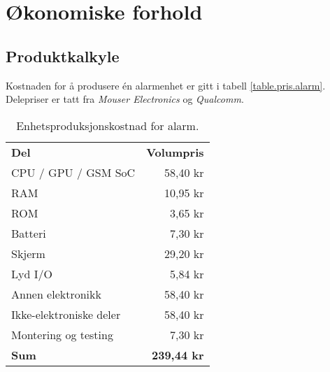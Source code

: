 



\clearpage
\section{Økonomiske forhold}

\subsection{Produktkalkyle}

Kostnaden for å produsere én alarmenhet er gitt i tabell
\vref{table.pris.alarm}.  Delepriser er tatt fra \textit{Mouser Electronics} og
\textit{Qualcomm}.

\begin{table}
  \centering
  \begin{tabular}{lr}
    \textbf{Del} & \textbf{Volumpris} \\
    CPU / GPU / GSM SoC & 58,40 kr \\
    RAM       & 10,95 kr \\
    ROM       &  3,65 kr \\
    Batteri   &  7,30 kr \\
    Skjerm    & 29,20 kr \\
    Lyd I/O   &  5,84 kr \\
    Annen elektronikk & 58,40 kr \\
    Ikke-elektroniske deler & 58,40 kr \\
    Montering og testing & 7,30 kr \\
    \textbf{Sum} & \textbf{239,44 kr} \\
  \end{tabular}
  \caption{Enhetsproduksjonskostnad for alarm.}
  \label{table.pris.alarm}
\end{table}


